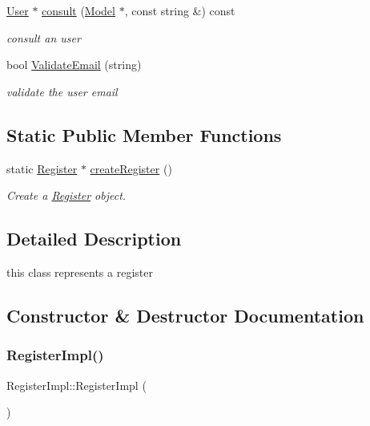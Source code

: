 \begin{DoxyCompactItemize}
\hyperlink{classUser}{User} $\ast$ \hyperlink{classRegisterImpl_afe762d2896bb50b551e7b317c4936ac3}{consult} (\hyperlink{classModel}{Model} $\ast$, const string \&) const
\begin{DoxyCompactList}\small\item\em consult an user \end{DoxyCompactList}\item 
bool \hyperlink{classRegisterImpl_a3c0a7f6df3b0be5ce7fe8d7a78214304}{Validate\+Email} (string)
\begin{DoxyCompactList}\small\item\em validate the user email \end{DoxyCompactList}\end{DoxyCompactItemize}
\subsection*{Static Public Member Functions}
\begin{DoxyCompactItemize}
\item 
static \hyperlink{classRegister}{Register} $\ast$ \hyperlink{classRegisterImpl_a505a9051efb8758a31da6ce97241741c}{create\+Register} ()
\begin{DoxyCompactList}\small\item\em Create a \hyperlink{classRegister}{Register} object. \end{DoxyCompactList}\end{DoxyCompactItemize}


\subsection{Detailed Description}
this class represents a register 

\subsection{Constructor \& Destructor Documentation}
\mbox{\label{classRegisterImpl_a601b77faf4f07f51170821a189fed94f}} 
\subsubsection{\texorpdfstring{Register\+Impl()}{RegisterImpl()}}
{\footnotesize\ttfamily Register\+Impl\+::\+Register\+Impl (\begin{DoxyParamCaption}{ }\end{DoxyParamCaption})}



